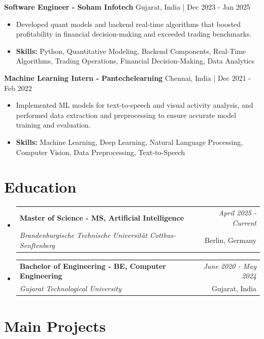 \documentclass[a4paper,11pt]{article}
\makeatletter
\newcommand{\resumeSubheading}[4]{
\vspace{0.5mm}\item
    \begin{tabular*}{\linewidth}[t]{l@{\extracolsep{\fill}}r}
        \textbf{#1} & \textit{\footnotesize{#4}} \\
        \textit{\footnotesize{#3}} &  \footnotesize{#2}\\
    \end{tabular*}
    \vspace{-2.4mm}
}
\makeatother
\begin{document}
\vspace{1mm}
  \textbf{Software Engineer - Soham Infotech} \hfill Gujarat, India | Dec 2023 - Jan 2025
\vspace{-1.5mm} %
\begin{itemize}
  \item Developed quant models and backend real-time algorithms that boosted profitability in financial decision-making and exceeded trading benchmarks.

\vspace{-2mm}
  \item \textbf{Skills:} Python, Quantitative Modeling, Backend Components, Real-Time Algorithms, Trading Operations, Financial Decision-Making, Data Analytics
\end{itemize}

\vspace{1mm}
  \textbf{Machine Learning Intern - Pantechelearning} \hfill Chennai, India | Dec 2021 - Feb 2022
\vspace{-1.5mm} %
\begin{itemize}
  \item Implemented ML models for text-to-speech and visual activity analysis, and performed data extraction and preprocessing to ensure accurate model training and evaluation.
\vspace{-2mm}
  \item \textbf{Skills:} Machine Learning, Deep Learning, Natural Language Processing, Computer Vision, Data Preprocessing, Text-to-Speech
\end{itemize}\section{\textbf{Education}}
\vspace{-0.4mm}

\begin{itemize}[leftmargin=0.15in, label={}]
\resumeSubheading
{Master of Science - MS, Artificial Intelligence }{Berlin, Germany}
{Brandenburgische Technische Universität Cottbus-Senftenberg  }{April 2025 - Current}

\vspace{1.0mm} %
\resumeSubheading
{Bachelor of Engineering - BE, Computer Engineering  }{Gujarat, India}
{Gujarat Technological University }{June 2020 - May 2024}

\end{itemize}
\section{\textbf{Main Projects}}
\end{document}

